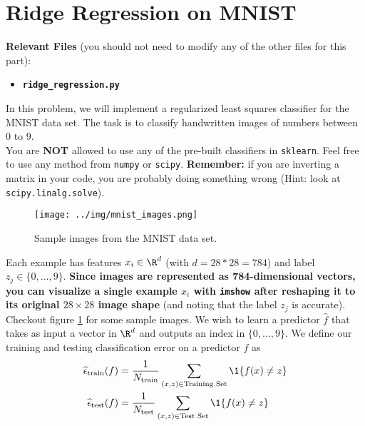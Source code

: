 \documentclass{article}
\begin{document}
\clearpage{}

\section*{Ridge Regression on MNIST}
{\bf Relevant Files} (you should not need to modify any of the other files for this part):
\vspace{-1.2em}
\begin{multicols}{2}
    \begin{itemize}[noitemsep,nolistsep]
        \item \texttt{\bf ridge\_regression.py}
    \end{itemize}
\end{multicols}
\begin{aprob}
    In this problem, we will implement a regularized least squares classifier for the MNIST data set. The task
    is to classify handwritten images of numbers between $0$ to $9$.\\
    
    You are \textbf{NOT} allowed to use any of the pre-built  classifiers in \verb|sklearn|.  Feel free to use any method from \verb|numpy| or \verb|scipy|. {\bf Remember:} if you are inverting a matrix in your code, you are probably doing something wrong (Hint: look at \verb|scipy.linalg.solve|).\\

    \begin{figure}[h!]
        \centering
        \texttt{[image: ../img/mnist\_images.png]}
        \caption{Sample images from the MNIST data set.}
        \label{fig:mnist}
    \end{figure}

    Each example has features $x_i \in \R^d$ (with $d=28*28=784$) and label $z_j \in \{0,\dots,9\}$. \textbf{Since images are represented as 784-dimensional vectors, you can visualize a single example $x_i$ with \texttt{imshow} after reshaping it to its original $28 \times 28$ image shape} (and noting that the label $z_j$ is accurate). Checkout figure \ref{fig:mnist} for some sample images. We wish to learn a predictor $\widehat{f}$ that takes as input a vector in $\R^d$ and outputs an index in $\{0,\dots,9\}$. We define our training and testing classification error on a predictor $f$ as
    \begin{align*}
        \widehat{\epsilon}_{\textrm{train}}(f) &=
        \frac{1}{N _{\textrm{train}}} \sum_{(x,z)\in \textrm{Training Set}}     \1\{ f(x) \neq z \}
        \\
          \widehat{\epsilon}_{\textrm{test}}(f) &=
          \frac{1}{N _{\textrm{test}}} \sum_{(x,z)\in \textrm{Test Set}}     \1\{ f(x) \neq z \} 
    \end{align*}
    

\end{aprob}
\end{document}
